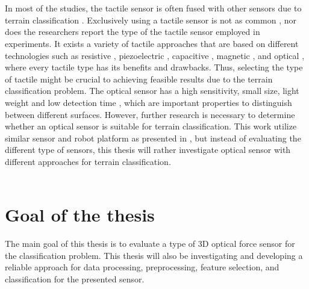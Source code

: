 \documentclass[USenglish]{ifimaster}  %
\begin{document}
\\
\\
In most of the studies, the tactile sensor is often fused with other sensors due to terrain classification \cite{5752869,6849778,Walas2015,Hoffmann20141790,7397881}. Exclusively using a tactile sensor is not as common \cite{6784609,Walas2015}, nor does the researchers report the type of the tactile sensor employed in experiments. It exists a variety of tactile approaches that are based on different technologies such as resistive \cite{928844,4276807,Wisitsoraat200717,351572}, piezoelectric  \cite{4200745,1331377}, capacitive \cite{99980,554353}, magnetic \cite{Chi2004172}, and optical \cite{220165,20431,Nicholls1990,1545264,1381228,7559098,Heo2006312}, where every tactile type has its benefits and drawbacks. Thus, selecting the type of tactile might be crucial to achieving feasible results due to the terrain classification problem. The optical sensor has a high sensitivity, small size, light weight and low detection time \cite{Dutta2016}, which are important properties to distinguish between different surfaces. However, further research is necessary to determine whether an optical sensor is suitable for terrain classification. This work utilize similar sensor and robot platform as presented in \cite{6784609}, but instead of evaluating the different type of sensors, this thesis will rather investigate optical sensor with different approaches for terrain classification.
\\
\\
\section{Goal of the thesis}
The main goal of this thesis is to evaluate a type of 3D optical force sensor for the classification problem. This thesis will also be investigating and developing a reliable approach for data processing, preprocessing, feature selection, and classification for the presented sensor.
\end{document}
